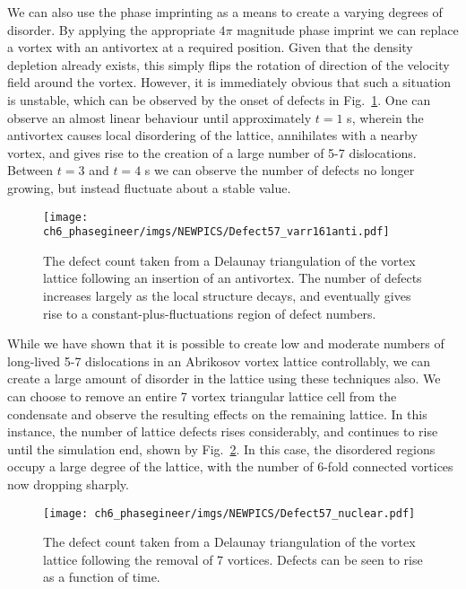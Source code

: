 We can also use the phase imprinting as a means to create a varying degrees of disorder. By applying the appropriate $4\pi$ magnitude phase imprint we can replace a vortex with an antivortex at a required position. Given that the density depletion already exists, this simply flips the rotation of direction of the velocity field around the vortex. However, it is immediately obvious that such a situation is unstable, which can be observed by the onset of defects in Fig.~\ref{fig:varr161anti_defect}. One can observe an almost linear behaviour until approximately $t=1$ s, wherein the antivortex causes local disordering of the lattice, annihilates with a nearby vortex, and gives rise to the creation of a large number of 5-7 dislocations. Between $t=3$ and $t=4$ s we can observe the number of defects no longer growing, but instead fluctuate about a stable value.

\begin{figure} \centering
    \vspace{1cm}
    \texttt{[image: ch6\_phasegineer/imgs/NEWPICS/Defect57\_varr161anti.pdf]}
    \caption{The defect count taken from a Delaunay triangulation of the vortex lattice following an insertion of an antivortex. The number of defects increases largely as the local structure decays, and eventually gives rise to a constant-plus-fluctuations region of defect numbers.}\label{fig:varr161anti_defect}
\end{figure}

While we have shown that it is possible to create low and moderate numbers of long-lived 5-7 dislocations in an Abrikosov vortex lattice controllably, we can create a large amount of disorder in the lattice using these techniques also. We can choose to remove an entire 7 vortex triangular lattice cell from the condensate and observe the resulting effects on the remaining lattice. In this instance, the number of lattice defects rises considerably, and continues to rise until the simulation end, shown by Fig.~\ref{fig:remove7_defect}. In this case, the disordered regions occupy a large degree of the lattice, with the number of 6-fold connected vortices now dropping sharply.

\begin{figure} \centering
    \texttt{[image: ch6\_phasegineer/imgs/NEWPICS/Defect57\_nuclear.pdf]}
    \caption{The defect count taken from a Delaunay triangulation of the vortex lattice following the removal of 7 vortices. Defects can be seen to rise as a function of time.}\label{fig:remove7_defect}
\end{figure}

